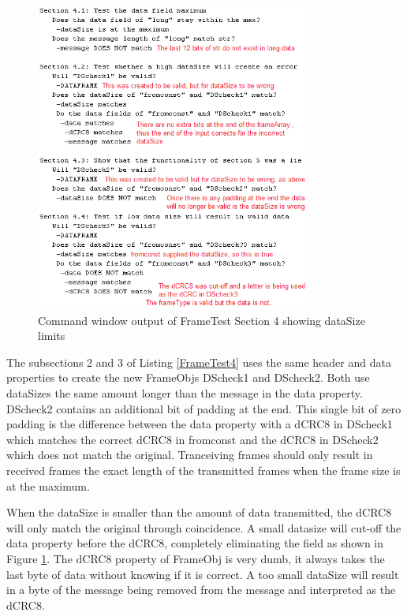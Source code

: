 \begin{figure}[!]
    \includegraphics[width=0.8\textwidth, left]{FrameTest4.PNG}
    \caption{Command window output of FrameTest Section 4 showing dataSize limits  }
    \label{fig:FrameTest4}
\end{figure}

The subsections 2 and 3 of Listing \ref{FrameTest4} uses the same header and data properties to create the new FrameObjs DScheck1 and DScheck2. Both use dataSizes the same amount longer than the message in the data property. DScheck2 contains an additional bit of padding at the end. This single bit of zero padding is the difference between the data property with a dCRC8 in DScheck1 which matches the correct dCRC8 in fromconst and the dCRC8 in DScheck2 which does not match the original. Tranceiving frames should only result in received frames the exact length of the transmitted frames when the frame size is at the maximum.

When the dataSize is smaller than the amount of data transmitted, the dCRC8 will only match the original through coincidence. A small datasize will cut-off the data property before the dCRC8, completely eliminating the field as shown in Figure \ref{fig:FrameTest4}. The dCRC8 property of FrameObj is very dumb, it always takes the last byte of data without knowing if it is correct. A too small dataSize will result in a byte of the message being removed from the message and interpreted as the dCRC8. 

